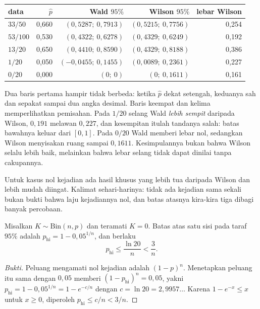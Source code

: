 \begin{center}
\small
\begin{tabular}{lrrrr}
\hline
data & $\hat p$ & Wald $95\%$ & Wilson $95\%$ & lebar Wilson \\
\hline
$33/50$  & 0,660 & $(0{,}5287;\ 0{,}7913)$ & $(0{,}5215;\ 0{,}7756)$ & 0,254 \\
$53/100$ & 0,530 & $(0{,}4322;\ 0{,}6278)$ & $(0{,}4329;\ 0{,}6249)$ & 0,192 \\
$13/20$  & 0,650 & $(0{,}4410;\ 0{,}8590)$ & $(0{,}4329;\ 0{,}8188)$ & 0,386 \\
$1/20$   & 0,050 & $(-0{,}0455;\ 0{,}1455)$ & $(0{,}0089;\ 0{,}2361)$ & 0,227 \\
$0/20$   & 0,000 & $(0;\ 0)$ & $(0;\ 0{,}1611)$ & 0,161 \\
\hline
\end{tabular}
\end{center}

Dua baris pertama hampir tidak berbeda: ketika $\hat p$ dekat setengah, keduanya sah
dan sepakat sampai dua angka desimal. Baris keempat dan kelima memperlihatkan
pemisahan. Pada $1/20$ selang Wald \emph{lebih sempit} daripada Wilson, $0{,}191$
melawan $0{,}227$, dan kesempitan itulah tandanya salah: batas bawahnya keluar dari
$[0,1]$. Pada $0/20$ Wald memberi lebar nol, sedangkan Wilson menyisakan ruang sampai
$0{,}1611$. Kesimpulannya bukan bahwa Wilson selalu lebih baik, melainkan bahwa lebar
selang tidak dapat dinilai tanpa cakupannya.

Untuk kasus nol kejadian ada hasil khusus yang lebih tua daripada Wilson dan lebih
mudah diingat. Kalimat sehari-harinya: tidak ada kejadian sama sekali bukan bukti
bahwa laju kejadiannya nol, dan batas atasnya kira-kira tiga dibagi banyak percobaan.


\begin{teorema}
Misalkan $K\sim\mathrm{Bin}(n,p)$ dan teramati $K=0$. Batas atas satu sisi pada taraf
$95\%$ adalah $p_{\mathrm{hi}}=1-0{,}05^{1/n}$, dan berlaku
\[
p_{\mathrm{hi}}\le\frac{\ln 20}{n}<\frac{3}{n}.
\]
\end{teorema}

\begin{proof}[Bukti]
Peluang mengamati nol kejadian adalah $(1-p)^n$. Menetapkan peluang itu sama dengan
$0{,}05$ memberi $(1-p_{\mathrm{hi}})^n=0{,}05$, yakni
$p_{\mathrm{hi}}=1-0{,}05^{1/n}=1-e^{-c/n}$ dengan $c=\ln 20=2{,}9957\ldots$ Karena
$1-e^{-x}\le x$ untuk $x\ge0$, diperoleh $p_{\mathrm{hi}}\le c/n<3/n$.
\end{proof}


